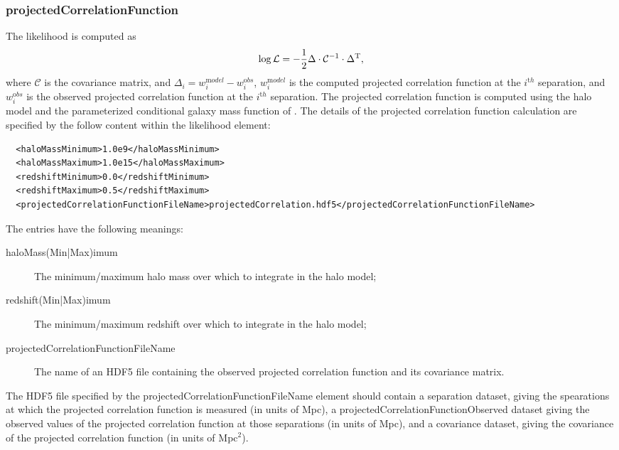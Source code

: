 \subsubsection{projectedCorrelationFunction}

The likelihood is computed as
\begin{equation}
\log \mathcal{L} = -{1\over2} \Delta \cdot \mathcal{C}^{-1} \cdot \Delta^{\mathrm T},
\end{equation}
where $\mathcal{C}$ is the covariance matrix, and $\Delta_i = w_i^{\mathrm model} - w_i^{\mathrm obs}$, $w_i^{\mathrm model}$ is the computed projected correlation function at the $i^{\mathrm th}$ separation, and $w_i^{\mathrm obs}$ is the observed projected correlation function at the $i^{\mathrm th}$ separation. The projected correlation function is computed using the halo model and the parameterized conditional galaxy mass function of \cite[][see also \protect\cite{leauthaud_new_2011}; \S\protect\ref{phys:conditionalMassFunction:conditionalMassFunctionBehroozi2010}]{behroozi_comprehensive_2010}. The details of the projected correlation function calculation are specified by the follow content within the {\normalfont \ttfamily likelihood} element:
\begin{verbatim}
  <haloMassMinimum>1.0e9</haloMassMinimum>
  <haloMassMaximum>1.0e15</haloMassMaximum>
  <redshiftMinimum>0.0</redshiftMinimum>
  <redshiftMaximum>0.5</redshiftMaximum>
  <projectedCorrelationFunctionFileName>projectedCorrelation.hdf5</projectedCorrelationFunctionFileName>
\end{verbatim}

The entries have the following meanings:
\begin{description}
\item[{\normalfont \ttfamily haloMass(Min|Max)imum}] The minimum/maximum halo mass over which to integrate in the halo model;
\item[{\normalfont \ttfamily redshift(Min|Max)imum}] The minimum/maximum redshift over which to integrate in the halo model;
\item[{\normalfont \ttfamily projectedCorrelationFunctionFileName}] The name of an HDF5 file containing the observed projected correlation function and its covariance matrix.
\end{description}

The HDF5 file specified by the {\normalfont \ttfamily projectedCorrelationFunctionFileName} element should contain a {\normalfont \ttfamily separation} dataset, giving the spearations at which the projected correlation function is measured (in units of Mpc), a {\normalfont \ttfamily projectedCorrelationFunctionObserved} dataset giving the observed values of the projected correlation function at those separations (in units of Mpc), and a {\normalfont \ttfamily covariance} dataset, giving the covariance of the projected correlation function (in units of Mpc$^2$).

